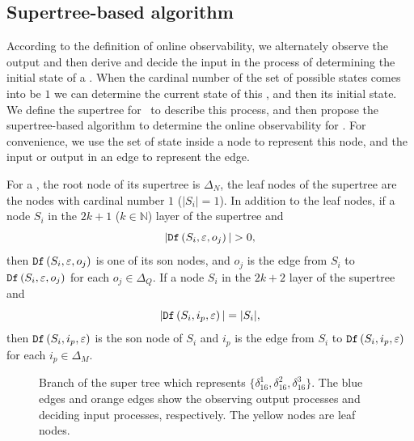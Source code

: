 \subsection{Supertree-based algorithm} %
According to the definition of online observability, we alternately observe the output and then derive and decide the input in the process of determining the initial state of a \BCN. When the  cardinal number of the set of possible states comes into be $1$ we can determine the current state of this \BCN, and then its initial state. We define the supertree for \BCNs\ to describe this process, and then propose the supertree-based algorithm to determine the online observability for \BCNs. For convenience, we use the set of state inside a node to represent this node, and the input or output in an edge to represent the edge.
\begin{definition}[Supertree]
For a \BCN, the root node of its supertree is $\Delta_N$, the leaf nodes of the supertree are the nodes with cardinal number $1$ ($|S_i|=1$). In addition to the leaf nodes, if a node $S_i$ in the $2k + 1$ ($k\in \mathbb{N}$) layer of the supertree and 
\[|\Ded\left(S_i,\varepsilon, o_j\right)|>0,\]
 then ${\tt Df}\left(S_i,\varepsilon, o_j\right)$ is one of its son nodes, and $o_j$ is the edge from $S_i$ to ${\tt Df}\left(S_i,\varepsilon, o_j\right)$ for each $o_j \in \Delta_Q$. If a node $S_i$ in the $2k+2$ layer of the supertree and  
\[|{\tt Df}\left(S_i,i_p,\varepsilon\right)|=|S_i|,\] 
then ${\tt Df}\left(S_i,i_p,\varepsilon\right)$ is the son node of $S_i$ and $i_p$ is the edge from $S_i$ to ${\tt Df}\left(S_i,i_p,\varepsilon\right)$ for each $i_p \in \Delta_M$. 
\label{def:super-tree}
\end{definition}

  \begin{figure}[thpb]
      \centering
      
      \caption{Branch of the super tree which represents $\{\delta_{16}^1,\delta_{16}^2,\delta_{16}^3\}$. The blue edges and orange edges show the observing output processes and deciding input processes, respectively. The yellow nodes are leaf nodes.}
      \label{fig:3}
   \end{figure}

